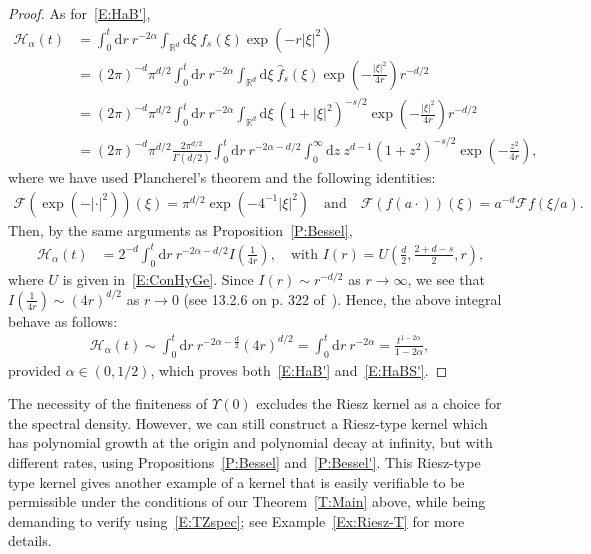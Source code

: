 \documentclass[sn-mathphys]{sn-jnl}%
\newcommand{\BR}{\mathbb{R}}
\newcommand{\ud}{\ensuremath{\mathrm{d}}}
\numberwithin{equation}{section}
\theoremstyle{thmstyleone}%
\theoremstyle{thmstyletwo}%
\theoremstyle{thmstylethree}%
\begin{document}
\begin{proof}
  As for~\eqref{E:HaB'},
	\begin{align*}
        \mathcal{H}_\alpha(t)
    & = \int_{0}^t \ud r \: r^{-2\alpha} \int_{\BR^d} \ud \xi \: f_{s}(\xi) \exp\left(-r\lvert\xi\rvert^2\right)                                                                 \\
    & = (2\pi)^{-d} \pi^{d/2} \int_{0}^t \ud r \: r^{-2\alpha} \int_{\BR^d} \ud \xi \: \widehat{f}_{s}(\xi) \exp\left(-\frac{\lvert\xi\rvert^2}{4r}\right) r^{-d/2}              \\
    & = (2\pi)^{-d} \pi^{d/2} \int_{0}^t \ud r \: r^{-2\alpha} \int_{\BR^d} \ud \xi \: \left(1 + \lvert\xi\rvert^2\right)^{-s / 2} \exp\left(-\frac{\lvert\xi\rvert^2}{4r}\right) r^{-d/2} \\
    & = (2\pi)^{-d} \pi^{d/2} \frac{2 \pi^{d/2}}{\Gamma\left(d/2\right)} \int_{0}^t \ud r \: r^{-2\alpha - d/2} \int_0^{\infty} \ud z \: z^{d-1} \left(1 + z^2\right)^{-s/2} \exp\left(-\frac{z^2}{4r}\right),
\end{align*}
  where we have used Plancherel's theorem and the following identities:
	\begin{align*}
    \mathcal{F}\left(\exp(-\lvert \cdot \rvert^2)\right)(\xi) = \pi^{d/2} \exp\left(-4^{-1}\lvert\xi\rvert^2\right) \quad \text{and} \quad
    \mathcal{F}(f(a\cdot))(\xi) = a^{-d}\mathcal{F}f(\xi / a).
	\end{align*}
  Then, by the same arguments as Proposition~\ref{P:Bessel},
	\begin{align*}
        \mathcal{H}_\alpha(t)
     & = 2^{-d} \int_{0}^t \ud r \: r^{-2\alpha - d/2} I\left(\frac{1}{4r}\right),
      \quad \text{with $I(r) = U\left(\frac{d}{2}, \frac{2+d-s}{2}, r\right)$,}
	\end{align*}
  where $U$ is given in~\eqref{E:ConHyGe}. Since $I(r) \sim r^{-d/2}$ as $r \to \infty$, we see that
  $I\left(\frac{1}{4r}\right) \sim (4r)^{d/2}$ as $r \to 0$ (see 13.2.6 on p. 322
  of~\cite{olver.lozier.ea:10:nist}). Hence, the above integral behave as follows:
	\begin{align*}
     \mathcal{H}_\alpha(t)
     \sim \int_{0}^t \ud r \: r^{-2\alpha - \frac{d}{2}} (4r)^{d/2}
     = \int_{0}^t \ud r \: r^{-2\alpha}
     = \frac{t^{1-2\alpha}}{1-2\alpha},
	\end{align*}
  provided $\alpha \in (0, 1/2)$, which proves both~\eqref{E:HaB'} and~\eqref{E:HaBS'}.
\end{proof}


The necessity of the finiteness of $\Upsilon(0)$ excludes the Riesz kernel as a choice for the
spectral density. However, we can still construct a Riesz-type kernel which has polynomial growth at
the origin and polynomial decay at infinity, but with different rates, using
Propositions~\ref{P:Bessel} and~\ref{P:Bessel'}. This Riesz-type type kernel gives another example
of a kernel that is easily verifiable to be permissible under the conditions of our
Theorem~\ref{T:Main} above, while being demanding to verify using~\eqref{E:TZspec}; see
Example~\ref{Ex:Riesz-T} for more details.
\end{document}
